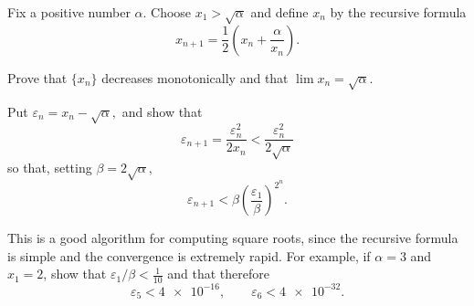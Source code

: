 \documentclass{assignment}
\begin{document}
\begin{question}[16]
  Fix a positive number $\alpha$. Choose $x_1 > \sqrt{\alpha}$ and define $x_n$ by the recursive 
formula $$x_{n+1} = \frac{1}{2}\left( x_n + \frac{\alpha}{x_n} \right).$$
\begin{qparts}
  \item Prove that $\{x_n\}$ decreases monotonically and that $\lim x_n = \sqrt{\alpha}.$
  \item Put $\varepsilon_n = x_n - \sqrt{\alpha},$ and show that $$\varepsilon_{n+1} = 
\frac{\varepsilon_n^2}{2x_n} < \frac{\varepsilon_n^2}{2\sqrt{\alpha}}$$ so that, setting $\beta = 
2\sqrt{\alpha}$, $$\varepsilon_{n+1} < \beta \left( \frac{\varepsilon_1}{\beta} \right)^{2^n}.$$
  \item This is a good algorithm for computing square roots, since the recursive formula is simple and
the convergence is extremely rapid. For example, if $\alpha = 3$ and $x_1 = 2$, show that $\varepsilon_1
/ \beta < \frac{1}{10}$ and that therefore $$\varepsilon_5 < \num{4e-16}, \qquad \varepsilon_6 < \num{4e-32}.$$
\end{qparts}
\end{question}
\end{document}
